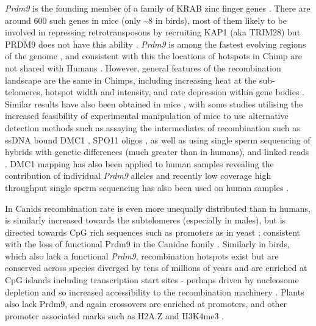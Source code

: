 \textit{Prdm9} is the founding member of a family of KRAB zinc finger genes \parencite{Birtle2006Meisetz}. There are around 600 such genes in mice (only \textasciitilde8 in birds), most of them likely to be involved in repressing retrotransposons by recruiting KAP1 (aka TRIM28) but PRDM9 does not have this ability \parencite{Imbeault2017KRAB, Bruno2019Arms}. \textit{Prdm9} is among the fastest evolving regions of the genome \parencite{Oliver2009Accelerated}, and consistent with this the locations of hotspots in Chimp are not shared with Humans \parencite{Wall2003Comparative, Ptak2004Absence, Ptak2005Finescale, Winckler2005Comparison}. However, general features of the recombination landscape are the same in Chimps, including increasing heat at the sub-telomeres, hotspot width and intensity, and rate depression within gene bodies \parencite{Auton2012FineScale}. Similar results have also been obtained in mice \parencite{Paigen2008Recombinational, Brunschwig2012FineScale, Booker2017Recombination}, with some studies utilising the increased feasibility of experimental manipulation of mice to use alternative detection methods such as assaying the intermediates of recombination such as ssDNA bound DMC1 \parencite{Smagulova2011Genomewide, Khil2012Sensitive, Smagulova2016evolutionary}, SPO11 oligos \parencite{Lange2016Landscape}, as well as using single sperm sequencing of hybrids with genetic differences (much greater than in humans)\parencite{Hinch2019Factors}, and linked reads \parencite{Dreau2019Genomewide}. DMC1 mapping has also been applied to human samples revealing the contribution of individual \textit{Prdm9} alleles \parencite{Pratto2014Recombination} and recently low coverage high throughput single sperm sequencing has also been used on human samples \parencite{Bell2019Insights}.

In Canids recombination rate is even more unequally distributed than in humans, is similarly increased towards the subtelomeres (especially in males), but is directed towards CpG rich sequences such as promoters as in yeast \parencite{Auton2013Genetic, Campbell2016PedigreeBased}; consistent with the loss of functional Prdm9 in the Canidae family \parencite{Munoz-Fuentes2011Prdm9}. Similarly in birds, which also lack a functional \textit{Prdm9}, recombination hotspots exist but are conserved across species diverged by tens of millions of years and are enriched at CpG islands including transcription start sites - perhaps driven by nucleosome depletion and so increased accessibility to the recombination machinery \parencite{Singhal2015Stable}. Plants also lack Prdm9, and again crossovers are enriched at promoters, and other promoter associated marks such as H2A.Z and H3K4me3 \parencite{Choi2013Arabidopsis, Marand2017Meiotic}.

